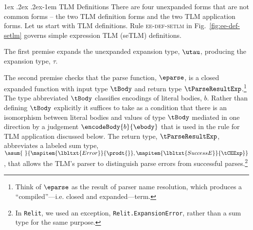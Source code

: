 \documentclass[acmsmall]{acmart}
\makeatletter
\renewcommand{\subsubsection}{%
  \@startsection{subsubsection}{3}%
  {\z@}{1ex \@plus .2ex \@minus .2ex}{-1em}%
  {\normalfont\normalsize\bfseries}%
}
\newcommand{\lifootnote}[1]{\lstinline[basicstyle=\ttfamily\fontsize{7pt}{1em}\selectfont]{#1}}
\makeatother
\begin{document}
\subsubsection{TLM Definitions}\label{sec:U-uetsm-definition}\label{sec:s-TLM-def}
 There are four unexpanded forms that are not common forms -- the two TLM definition forms and the two TLM application forms. Let us start with TLM definitions. Rule \textsc{ee-def-setlm} in Fig.~\ref{fig:ee-def-setlm} governs simple expression TLM (seTLM) definitions. %

 The first premise expands the unexpanded expansion type, $\utau$, producing the expansion type, $\tau$. 

 The second premise checks that the parse function, $\eparse$, is a closed expanded function with input type $\tBody$ and return type $\tParseResultExp$.\footnote{Think of $\eparse$ as the result of parser name resolution, which produces a ``compiled''---i.e. closed and expanded---term.}
 The type abbreviated $\tBody$ classifies encodings of literal bodies, $b$. Rather than defining $\tBody$ explicitly it suffices to take as a condition that there is an isomorphism between literal bodies and values of type $\tBody$ mediated in one direction by a judgement $\encodeBody{b}{\ebody}$ that is used in the rule for TLM application discussed below. The return type, $\tParseResultExp$, abbreviates a labeled sum type, 
{$
  \asum{~}{\mapitem{\lbltxt{Error}}{\prodt{}}, 
  \mapitem{\lbltxt{SuccessE}}{\tCEExp}}
$}, that allows the TLM's parser to distinguish parse errors from successful parses.\footnote{In \lifootnote{Relit}, we used an exception, \lifootnote{Relit.ExpansionError}, rather than a sum type for the same purpose.}
\end{document}
